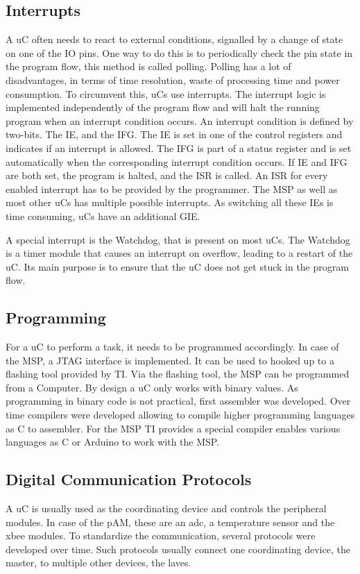 \subsection{Interrupts}
A \ac{uC} often needs to react to external conditions, signalled by a change of state on one of the \ac{IO} pins. One way to do this is to periodically check the pin state in the program flow, this method is called polling. Polling has a lot of disadvantages, in terms of time resolution, waste of processing time and power consumption. To circumvent this, \acp{uC} use interrupts. The interrupt logic is implemented independently of the program flow and will halt the running program when an interrupt condition occurs. An interrupt condition is defined by two-bits. The \ac{IE}, and the \ac{IFG}. The \ac{IE} is set in one of the control registers and indicates if an interrupt is allowed. The \ac{IFG} is part of a status register and is set automatically when the corresponding interrupt condition occurs.
If \ac{IE} and \ac{IFG} are both set, the program is halted, and the \ac{ISR} is called. An \ac{ISR} for every enabled interrupt has to be provided by the programmer. 
The MSP as well as most other \acp{uC} has multiple possible interrupts. As switching all these \acp{IE} is time consuming, \acp{uC} have an additional \ac{GIE}.

A special interrupt is the Watchdog, that is present on most \acp{uC}. The Watchdog is a timer module that causes an interrupt on overflow, leading to a restart of the \ac{uC}. Its main purpose is to ensure that the \ac{uC} does not get stuck in the program flow.

\subsection{Programming}
For a \ac{uC} to perform a task, it needs to be programmed accordingly. In case of the MSP, a JTAG interface is implemented. It can be used to hooked up to a flashing tool provided by \ac{TI}. Via the flashing tool, the MSP can be programmed from a Computer. By design a \ac{uC} only works with binary values. As programming in binary code is not practical, first assembler was developed. Over time compilers were developed allowing to compile higher programming languages as C to assembler. For the MSP \ac{TI} provides a special compiler enables various languages as C or Arduino to work with the MSP.
\subsection{Digital Communication Protocols}
A \ac{uC} is usually used as the coordinating device and controls the peripheral modules. In case of the \ac{pAM}, these are an \ac{adc}, a temperature sensor and the \acs{xbee} modules. To standardize the communication, several protocols were developed over time. Such protocols usually connect one coordinating device, the master, to multiple other devices, the laves.
